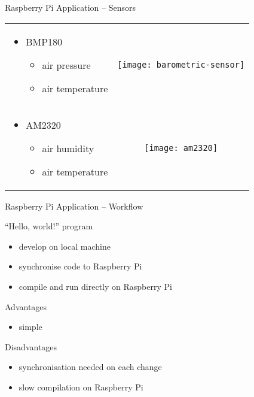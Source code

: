 \documentclass[aspectratio=1610]{beamer}
\newcommand\green[1]{{\color{green(ncs)}#1}}
\newcommand\red[1]{{\color{amaranth}#1}}
\begin{document}
  \begin{frame}{Raspberry Pi Application -- Sensors}
    \begin{tabularx}{\textwidth}{XC}
      \begin{itemize}
        \item BMP180
          \begin{itemize}
            \item air pressure
            \item air temperature
          \end{itemize}
      \end{itemize}
      &
      \texttt{[image: barometric-sensor]}
      \\
      \begin{itemize}
        \item AM2320
          \begin{itemize}
            \item air humidity
            \item air temperature
          \end{itemize}
      \end{itemize}
      &
      \texttt{[image: am2320]}
    \end{tabularx}
  \end{frame}

  \begin{frame}{Raspberry Pi Application -- Workflow}
    \begin{block}{“Hello, world!” program}
      \begin{itemize}
        \item develop on local machine
        \item synchronise code to Raspberry Pi
        \item compile and run directly on Raspberry Pi
      \end{itemize}
    \end{block}
    \begin{block}{\green{Advantages}}
      \begin{itemize}
        \item simple
      \end{itemize}
    \end{block}
    \begin{block}{\red{Disadvantages}}
      \begin{itemize}
        \item synchronisation needed on each change
        \item slow compilation on Raspberry Pi
      \end{itemize}
    \end{block}
  \end{frame}
\end{document}
